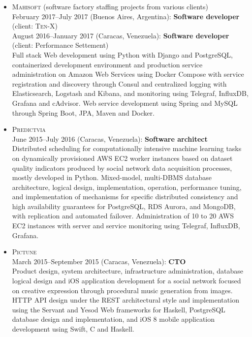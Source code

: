 \documentclass{res}
\begin{document}
\begin{resume}
\begin{itemize}[leftmargin=-0.3in]
    \item
      \textsc{Mahisoft} (software factory staffing projects from various clients)
      \\ February 2017--July 2017 (Buenos Aires, Argentina): \textbf{Software developer} (client: \textsc{Ten-X})
      \\ August 2016--January 2017 (Caracas, Venezuela): \textbf{Software developer} (client: Performance Settement)
      \\ \small{Full stack Web development using Python with Django and PostgreSQL, containerized development environment and production service administration on Amazon Web Services using Docker Compose with service registration and discovery through Consul and centralized logging with Elasticsearch, Logstash and Kibana, and monitoring using Telegraf, InfluxDB, Grafana and cAdvisor.  Web service development using Spring and MySQL through Spring Boot, JPA, Maven and Docker.}

    \item
      \textsc{Predictvia}
      \\ June 2015--July 2016 (Caracas, Venezuela): \textbf{Software architect}
      \\ \small{Distributed scheduling for computationally intensive machine learning tasks on dynamically provisioned AWS EC2 worker instances based on dataset quality indicators produced by social network data acquisition processes, mostly developed in Python.  Mixed-model, multi-DBMS database architecture, logical design, implementation, operation, performance tuning, and implementation of mechanisms for specific distributed consistency and high availability guarantees for PostgreSQL, RDS Aurora, and MongoDB, with replication and automated failover.  Administration of 10 to 20 AWS EC2 instances with server and service monitoring using Telegraf, InfluxDB, Grafana.}

    \item
      \textsc{Pictune}
      \\ March 2015--September 2015 (Caracas, Venezuela): \textbf{CTO}
      \\ \small{Product design, system architecture, infrastructure administration, database logical design and iOS application development for a social network focused on creative expression through procedural music generation from images.  HTTP API design under the REST architectural style and implementation using the Servant and Yesod Web frameworks for Haskell, PostgreSQL database design and implementation, and iOS 8 mobile application development using Swift, C and Haskell.}


\end{itemize}
\end{resume}
\end{document}
